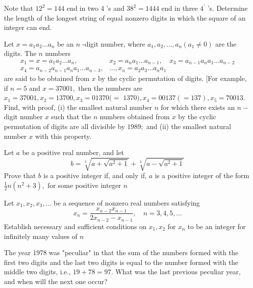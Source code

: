 \documentclass{pset}
\begin{document}
\begin{problems}
\begin{problem}[IrMO 1989 Q4]
    Note that \(12^{2}=144\) end in two 4 's and \(38^{2}=1444\) end in three \(4^{\prime}\) 's. Determine the length of the longest string of equal nonzero digits in which the square of an integer can end.
\end{problem}

\begin{problem}[IrMO 1989 Q5]
    Let \(x=a_{1} a_{2} \ldots a_{n}\) be an \(n\) -digit number, where \(a_{1}, a_{2}, \ldots, a_{n}\left(a_{1} \neq 0\right)\) are the digits. The \(n\) numbers
    $$
    \begin{aligned}
    x_{1}=x=a_{1} a_{2} \ldots a_{n}, & x_{2}=a_{n} a_{1} \ldots a_{n-1}, \quad x_{3}=a_{n-1} a_{n} a_{1} \ldots a_{n-2} \\
    x_{4}=a_{n-2} a_{n-1} a_{n} a_{1} \ldots a_{n-3}, & \ldots, x_{n}=a_{2} a_{3} \ldots a_{n} a_{1}
    \end{aligned}
    $$
    are said to be obtained from \(x\) by the cyclic permutation of digits. [For example, if \(n=5\) and \(x=37001,\) then the numbers are \(x_{1}=37001, x_{2}=13700, x_{3}=01370(=\) \(1370), x_{4}=00137(=137), x_{5}=70013 .\)
    Find, with proof, (i) the smallest natural number \(n\) for which there exists an \(n-\) digit number \(x\) such that the \(n\) numbers obtained from \(x\) by the cyclic permutation
    of digits are all divisible by \(1989 ;\) and (ii) the smallest natural number \(x\) with this property.
\end{problem}

\begin{problem}[IrMO 1989 Q9]
    Let \(a\) be a positive real number, and let
    $$
    b=\sqrt[3]{a+\sqrt{a^{2}+1}}+\sqrt[3]{a-\sqrt{a^{2}+1}}
    $$
    Prove that \(b\) is a positive integer if, and only if, \(a\) is a positive integer of the form \(\frac{1}{2} n\left(n^{2}+3\right),\) for some positive integer \(n\)
\end{problem}

\begin{problem}[IrMO 1988 Q8]
    Let \(x_{1}, x_{2}, x_{3}, \ldots\) be a sequence of nonzero real numbers satisfying
    $$
    x_{n}=\frac{x_{n-2} x_{n-1}}{2 x_{n-2}-x_{n-1}}, \quad n=3,4,5, \ldots
    $$
    Establish necessary and sufficient conditions on \(x_{1}, x_{2}\) for \(x_{n}\) to be an integer for infinitely many values of \(n\)
\end{problem}

\begin{problem}[1988 Q9]
    The year 1978 was "peculiar" in that the sum of the numbers formed with the first two digits and the last two digits is equal to the number formed with the middle two digits, i.e., \(19+78=97 .\) What was the last previous peculiar year, and when will the next one occur?
\end{problem}


\end{problems}
\end{document}
